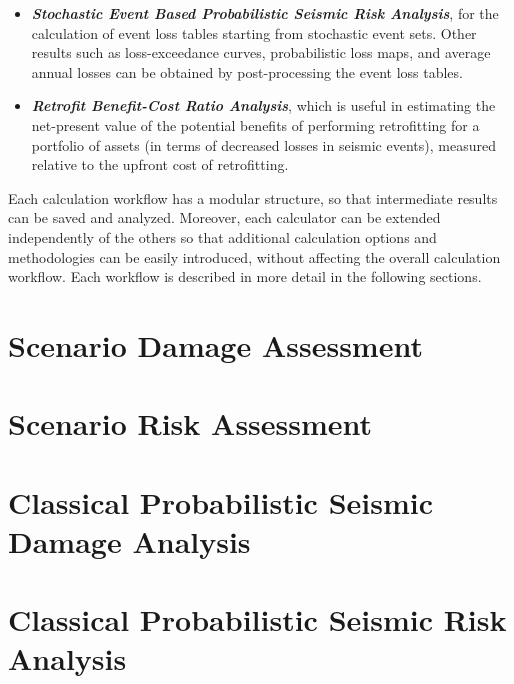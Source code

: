 \begin{itemize}
	\item \textit{\textbf{Stochastic Event Based Probabilistic Seismic Risk Analysis}}, 
	for the calculation of event loss tables starting from stochastic event sets.
	Other results such as loss-exceedance curves, probabilistic loss maps, 
	and average annual losses can be obtained by 
	post-processing the event loss tables.

    \item \textit{\textbf{Retrofit Benefit-Cost Ratio Analysis}}, which is
	useful in estimating the net-present value of the potential benefits of
	performing retrofitting for a portfolio of assets (in terms of decreased
	losses in seismic events), measured relative to the upfront cost of
	retrofitting.

\end{itemize}

Each calculation workflow has a modular structure, so that intermediate
results can be saved and analyzed. Moreover, each calculator can be
extended independently of the others so that additional calculation options
and methodologies can be easily introduced, without affecting the overall
calculation workflow. Each workflow is described in more detail in the
following sections.

\section{Scenario Damage Assessment}
\label{sec:workflow_scenario_damage}


\section{Scenario Risk Assessment}
\label{sec:workflow_scenario_risk}


\section{Classical Probabilistic Seismic Damage Analysis}
\label{sec:workflow_classical_damage}


\section{Classical Probabilistic Seismic Risk Analysis}
\label{sec:workflow_classical_risk}


